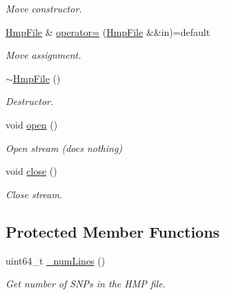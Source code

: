 \begin{DoxyCompactItemize}
\begin{DoxyCompactList}\small\item\em Move constructor. \end{DoxyCompactList}\item 
\mbox{\label{classvarfiles_1_1_hmp_file_a016f5adae4b155bbc1faf28a36b7942c}} 
\hyperlink{classvarfiles_1_1_hmp_file}{Hmp\+File} \& \hyperlink{classvarfiles_1_1_hmp_file_a016f5adae4b155bbc1faf28a36b7942c}{operator=} (\hyperlink{classvarfiles_1_1_hmp_file}{Hmp\+File} \&\&in)=default
\begin{DoxyCompactList}\small\item\em Move assignment. \end{DoxyCompactList}\item 
\mbox{\label{classvarfiles_1_1_hmp_file_af9323ec0d264150c806c7c9de4cc0466}} 
\hyperlink{classvarfiles_1_1_hmp_file_af9323ec0d264150c806c7c9de4cc0466}{$\sim$\+Hmp\+File} ()
\begin{DoxyCompactList}\small\item\em Destructor. \end{DoxyCompactList}\item 
\mbox{\label{classvarfiles_1_1_hmp_file_a9430402ecd28c046d27852ee29f275bb}} 
void \hyperlink{classvarfiles_1_1_hmp_file_a9430402ecd28c046d27852ee29f275bb}{open} ()
\begin{DoxyCompactList}\small\item\em Open stream (does nothing) \end{DoxyCompactList}\item 
\mbox{\label{classvarfiles_1_1_hmp_file_a72b0f031c2260be66397752be52c929f}} 
void \hyperlink{classvarfiles_1_1_hmp_file_a72b0f031c2260be66397752be52c929f}{close} ()
\begin{DoxyCompactList}\small\item\em Close stream. \end{DoxyCompactList}\end{DoxyCompactItemize}
\subsection*{Protected Member Functions}
\begin{DoxyCompactItemize}
\item 
uint64\+\_\+t \hyperlink{classvarfiles_1_1_hmp_file_a7f349e751b8a95cb1b4ded06eef85af9}{\+\_\+num\+Lines} ()
\begin{DoxyCompactList}\small\item\em Get number of S\+N\+Ps in the H\+MP file. \end{DoxyCompactList}\end{DoxyCompactItemize}
